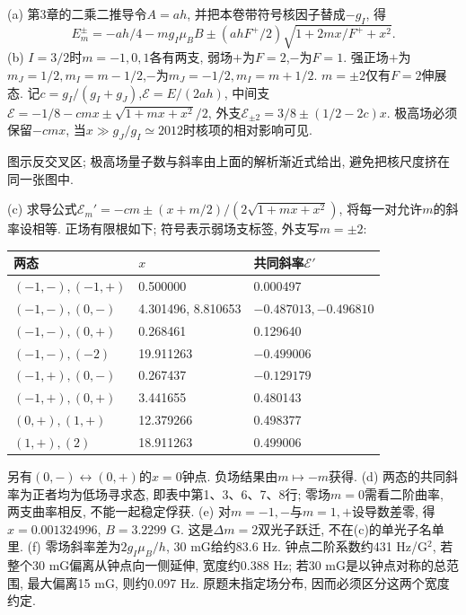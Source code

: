 \begin{solution}(a) 第3章的二乘二推导令$A=ah$, 并把本卷带符号核因子替成$-g_I$, 得
\[E_m^\pm=-ah/4-mg_I\mu_BB\pm(ahF^+/2)\sqrt{1+2mx/F^++x^2}.\]
(b) $I=3/2$时$m=-1,0,1$各有两支, 弱场$+$为$F=2$,$-$为$F=1$. 强正场$+$为$m_J=1/2,m_I=m-1/2$,$-$为$m_J=-1/2,m_I=m+1/2$. $m=\pm2$仅有$F=2$伸展态. 记$c=g_I/(g_I+g_J)$,$\mathcal E=E/(2ah)$, 中间支$\mathcal E=-1/8-cmx\pm\sqrt{1+mx+x^2}/2$, 外支$\mathcal E_{\pm2}=3/8\pm(1/2-2c)x$. 极高场必须保留$-cmx$, 当$x\gg g_J/g_I\simeq2012$时核项的相对影响可见.

\begin{center}\end{center}
图示反交叉区; 极高场量子数与斜率由上面的解析渐近式给出, 避免把核尺度挤在同一张图中.

(c) 求导公式$\mathcal E_m'=-cm\pm(x+m/2)/(2\sqrt{1+mx+x^2})$, 将每一对允许$m$的斜率设相等. 正场有限根如下; 符号表示弱场支标签, 外支写$m=\pm2$:
\begin{center}\begin{tabular}{lll}\toprule
两态 & $x$ & 共同斜率$\mathcal E'$\\\midrule
$(-1,-),(-1,+)$&0.500000&0.000497\\
$(-1,-),(0,-)$&4.301496, 8.810653&$-0.487013,-0.496810$\\
$(-1,-),(0,+)$&0.268461&0.129640\\
$(-1,-),(-2)$&19.911263&$-0.499006$\\
$(-1,+),(0,-)$&0.267437&$-0.129179$\\
$(-1,+),(0,+)$&3.441655&0.480143\\
$(0,+),(1,+)$&12.379266&0.498377\\
$(1,+),(2)$&18.911263&0.499006\\\bottomrule
\end{tabular}\end{center}
另有$(0,-)\leftrightarrow(0,+)$的$x=0$钟点. 负场结果由$m\mapsto-m$获得. (d) 两态的共同斜率为正者均为低场寻求态, 即表中第1、3、6、7、8行; 零场$m=0$需看二阶曲率, 两支曲率相反, 不能一起稳定俘获. (e) 对$m=-1,-$与$m=1,+$设导数差零, 得$x=0.001324996$, $B=3.2299$ G. 这是$\Delta m=2$双光子跃迁, 不在(c)的单光子名单里. (f) 零场斜率差为$2g_I\mu_B/h$, 30 mG给约83.6 Hz. 钟点二阶系数约431 Hz/G$^2$, 若整个30 mG偏离从钟点向一侧延伸, 宽度约0.388 Hz; 若30 mG是以钟点对称的总范围, 最大偏离15 mG, 则约0.097 Hz. 原题未指定场分布, 因而必须区分这两个宽度约定.
\end{solution}
